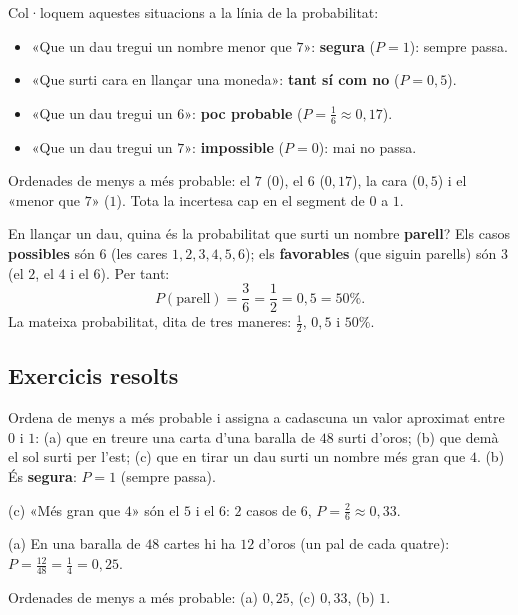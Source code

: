 \begin{exemple}
Col·loquem aquestes situacions a la línia de la probabilitat:
\begin{itemize}[leftmargin=1.4em, itemsep=1pt]
  \item «Que un dau tregui un nombre menor que $7$»: \textbf{segura} ($P=1$): sempre
        passa.
  \item «Que surti cara en llançar una moneda»: \textbf{tant sí com no} ($P=0,5$).
  \item «Que un dau tregui un $6$»: \textbf{poc probable} ($P=\frac{1}{6}\approx 0,17$).
  \item «Que un dau tregui un $7$»: \textbf{impossible} ($P=0$): mai no passa.
\end{itemize}
Ordenades de menys a més probable: el $7$ ($0$), el $6$ ($0,17$), la cara ($0,5$) i el
«menor que $7$» ($1$). Tota la incertesa cap en el segment de $0$ a $1$.
\end{exemple}

\begin{exemple}
En llançar un dau, quina és la probabilitat que surti un nombre \textbf{parell}? Els
casos \textbf{possibles} són $6$ (les cares $1,2,3,4,5,6$); els \textbf{favorables} (que
siguin parells) són $3$ (el $2$, el $4$ i el $6$). Per tant:
\[
P(\text{parell})=\frac{3}{6}=\frac{1}{2}=0,5=50\%.
\]
La mateixa probabilitat, dita de tres maneres: $\frac{1}{2}$, $0,5$ i $50\%$.
\end{exemple}

\subsection{Exercicis resolts}

\begin{exresolt}
Ordena de menys a més probable i assigna a cadascuna un valor aproximat entre $0$ i $1$:
(a) que en treure una carta d'una baralla de $48$ surti d'oros; (b) que demà el sol
surti per l'est; (c) que en tirar un dau surti un nombre més gran que $4$.
\solucio
(b) És \textbf{segura}: $P=1$ (sempre passa).

(c) «Més gran que $4$» són el $5$ i el $6$: $2$ casos de $6$, $P=\frac{2}{6}\approx 0,33$.

(a) En una baralla de $48$ cartes hi ha $12$ d'oros (un pal de cada quatre): $P=\frac{12}{48}=\frac{1}{4}=0,25$.

Ordenades de menys a més probable: (a) $0,25$, (c) $0,33$, (b) $1$.
\end{exresolt}


